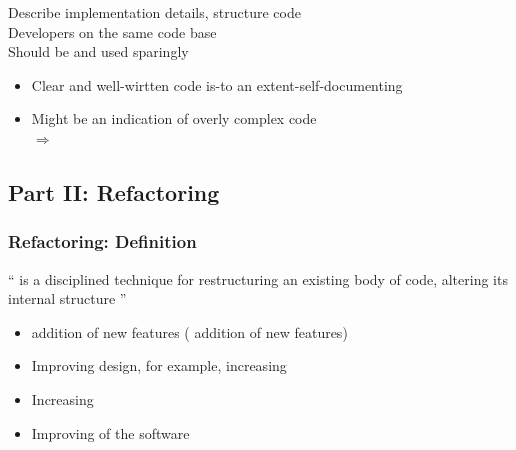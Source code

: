 \begin{defBox}[title=Statement level comments]
     Describe implementation details, structure code\\
     Developers on the same code base\\
    Should be  and used sparingly
    \begin{itemize}
        \item Clear and well-wirtten code is-to an extent-self-documenting
        \item Might be an indication of overly complex code\\
        $\Rightarrow$ 
    \end{itemize}
\end{defBox}

\subsection{Part II: Refactoring}
\subsubsection{Refactoring: Definition}
\enquote{ is a disciplined technique for restructuring an existing body of code, altering its internal structure }
\begin{defBox}[title=Objectives]
    \begin{itemize}
        \item {} addition of new features ( addition of new features)
        \item Improving design, for example, increasing 
        \item Increasing 
        \item Improving  of the software
    \end{itemize}
\end{defBox}
